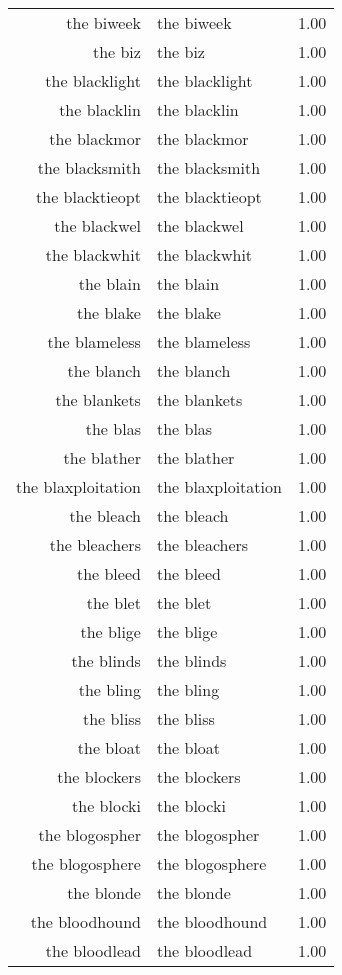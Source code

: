 \begin{table}[ht]
\begin{tabular}{rlr}
  the biweek & the biweek & 1.00 \\ 
  the biz & the biz & 1.00 \\ 
  the blacklight & the blacklight & 1.00 \\ 
  the blacklin & the blacklin & 1.00 \\ 
  the blackmor & the blackmor & 1.00 \\ 
  the blacksmith & the blacksmith & 1.00 \\ 
  the blacktieopt & the blacktieopt & 1.00 \\ 
  the blackwel & the blackwel & 1.00 \\ 
  the blackwhit & the blackwhit & 1.00 \\ 
  the blain & the blain & 1.00 \\ 
  the blake & the blake & 1.00 \\ 
  the blameless & the blameless & 1.00 \\ 
  the blanch & the blanch & 1.00 \\ 
  the blankets & the blankets & 1.00 \\ 
  the blas & the blas & 1.00 \\ 
  the blather & the blather & 1.00 \\ 
  the blaxploitation & the blaxploitation & 1.00 \\ 
  the bleach & the bleach & 1.00 \\ 
  the bleachers & the bleachers & 1.00 \\ 
  the bleed & the bleed & 1.00 \\ 
  the blet & the blet & 1.00 \\ 
  the blige & the blige & 1.00 \\ 
  the blinds & the blinds & 1.00 \\ 
  the bling & the bling & 1.00 \\ 
  the bliss & the bliss & 1.00 \\ 
  the bloat & the bloat & 1.00 \\ 
  the blockers & the blockers & 1.00 \\ 
  the blocki & the blocki & 1.00 \\ 
  the blogospher & the blogospher & 1.00 \\ 
  the blogosphere & the blogosphere & 1.00 \\ 
  the blonde & the blonde & 1.00 \\ 
  the bloodhound & the bloodhound & 1.00 \\ 
  the bloodlead & the bloodlead & 1.00 \\ 

\end{tabular}
\end{table}
